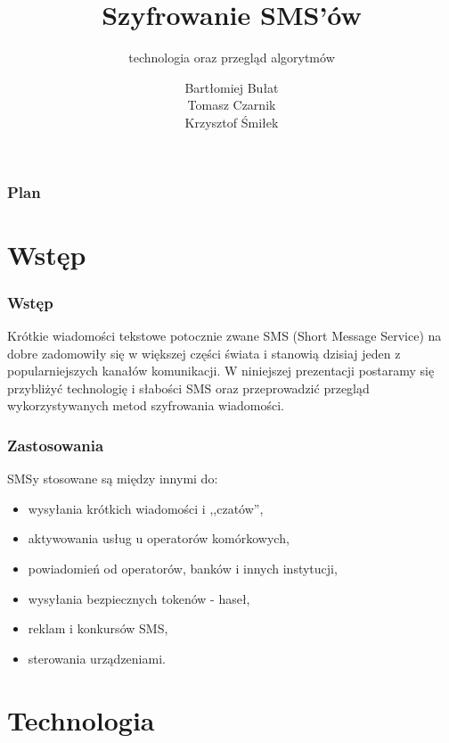 \documentclass[xcolor=table]{beamer}
\title{Szyfrowanie SMS’ów}
\subtitle{technologia oraz przegląd algorytmów}
\author{Bartłomiej Bułat\\
Tomasz Czarnik\\
Krzysztof Śmiłek\\}
\begin{document}
\begin{frame}
  \titlepage
\end{frame}


\begin{frame}
  \frametitle{Plan}
  \tableofcontents
\end{frame}


\section{Wstęp}

\begin{frame}
  \frametitle{Wstęp}
 Krótkie wiadomości tekstowe potocznie zwane SMS (Short Message Service) na dobre zadomowiły się w większej części świata i stanowią dzisiaj jeden z popularniejszych kanałów komunikacji. \newline
\newline
W niniejszej prezentacji postaramy się przybliżyć technologię i słabości SMS oraz przeprowadzić przegląd wykorzystywanych metod szyfrowania wiadomości.  
\end{frame}

\begin{frame}
  \frametitle{Zastosowania}

SMSy stosowane są między innymi do:
\begin{itemize}
\item wysyłania krótkich wiadomości i ,,czatów'',
\item aktywowania usług u operatorów komórkowych,
\item powiadomień od operatorów, banków i innych instytucji,
\item wysyłania bezpiecznych tokenów - haseł,
\item reklam i konkursów SMS,
\item sterowania urządzeniami. 
\end{itemize}
   
\end{frame}

\section{Technologia}
\end{document}
